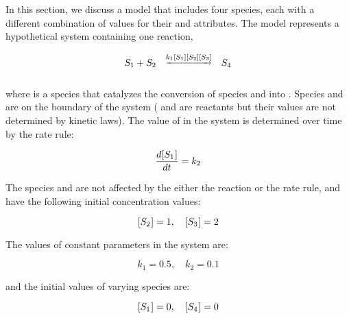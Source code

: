 In this section, we discuss a model that includes four species,
each with a different combination of values for their
 and  attributes.  The
model represents a hypothetical system containing one reaction,
\begin{linenomath}
\begin{equation*}
  \begin{array}{@{}ccc@{}}
    S_1 + S_2 & \overset{\underrightarrow{k_1 [S_1] [S_2] [S_3]}}{} & S_4 \\ \\[-4pt]
  \end{array}
\end{equation*}
\end{linenomath}
where  is a species that catalyzes the conversion of
species  and  into .
Species  and  are on the boundary of the
system (\ie {} and  are reactants but
their values are not determined by kinetic laws).  The value of
 in the system is determined over time by the rate
rule:
\begin{linenomath}
  \begin{equation*}
    \dfrac{d [S_1\mkern1mu]}{d t} = k_2
  \end{equation*}
\end{linenomath}
The species  and  are not affected by
the either the reaction or the rate rule, and have the following
initial concentration values:
\begin{linenomath}
  \begin{equation*}
    [S_2\mkern1mu] = 1, \quad [S_3\mkern1mu] = 2
  \end{equation*}
\end{linenomath}
The values of constant parameters in the system are:
\begin{linenomath}
  \begin{equation*}
    k_1 = 0.5, \quad k_2 = 0.1
  \end{equation*}
\end{linenomath}
and the initial values of varying species are:
\begin{linenomath}
  \begin{equation*}
    [S_1\mkern1mu] = 0, \quad [S_4\mkern1mu] = 0
  \end{equation*}
\end{linenomath}

